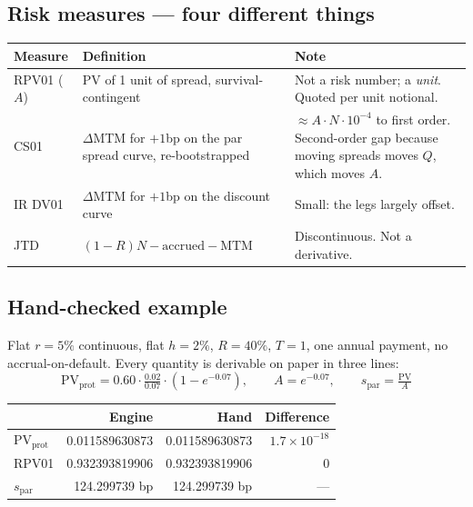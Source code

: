 \documentclass[11pt,a4paper]{article}
\begin{document}
\subsection{Risk measures --- four different things}

\begin{center}
\begin{tabular}{p{2.3cm}p{5.6cm}p{6.4cm}}
\toprule
\textbf{Measure} & \textbf{Definition} & \textbf{Note} \\
\midrule
RPV01 ($A$) & PV of 1 unit of spread, survival-contingent & Not a risk number; a \emph{unit}. Quoted per unit notional. \\[0.3em]
CS01 & $\Delta$MTM for $+1$bp on the par spread curve, re-bootstrapped & $\approx A\cdot N\cdot 10^{-4}$ to first order. Second-order gap because moving spreads moves $Q$, which moves $A$. \\[0.3em]
IR DV01 & $\Delta$MTM for $+1$bp on the discount curve & Small: the legs largely offset. \\[0.3em]
JTD & $(1-R)N - \text{accrued} - \text{MTM}$ & Discontinuous. Not a derivative. \\
\bottomrule
\end{tabular}
\end{center}

\subsection{Hand-checked example}

Flat $r = 5\%$ continuous, flat $h = 2\%$, $R = 40\%$, $T = 1$, one annual payment, no
accrual-on-default. Every quantity is derivable on paper in three lines:
\[
\text{PV}_{\text{prot}} = 0.60\cdot\tfrac{0.02}{0.07}\cdot(1-e^{-0.07}),
\qquad A = e^{-0.07},
\qquad s_{\text{par}} = \tfrac{\text{PV}}{A}
\]

\begin{center}
\begin{tabular}{lrrr}
\toprule
& \textbf{Engine} & \textbf{Hand} & \textbf{Difference} \\
\midrule
PV$_{\text{prot}}$ & 0.011589630873 & 0.011589630873 & $1.7\times10^{-18}$ \\
RPV01              & 0.932393819906 & 0.932393819906 & 0 \\
$s_{\text{par}}$   & 124.299739 bp  & 124.299739 bp  & --- \\
\bottomrule
\end{tabular}
\end{center}
\end{document}
